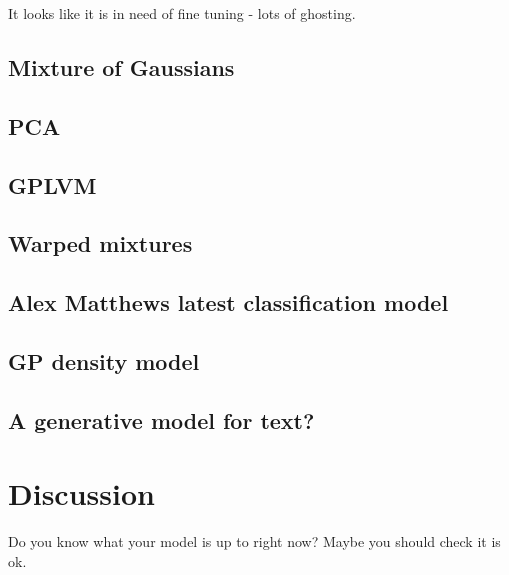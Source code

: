 \documentclass{article}
\begin{document}
It looks like it is in need of fine tuning - lots of ghosting.

\subsection{Mixture of Gaussians}

\subsection{PCA}

\subsection{GPLVM}

\subsection{Warped mixtures}

\subsection{Alex Matthews latest classification model}

\subsection{GP density model}

\subsection{A generative model for text?}

\section{Discussion}

Do you know what your model is up to right now?
Maybe you should check it is ok.



\end{document}
